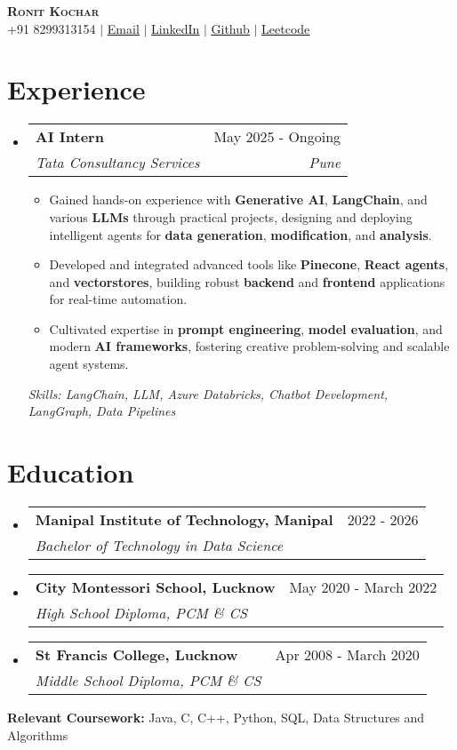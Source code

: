 \documentclass[letterpaper,10pt]{article}
\makeatletter
\newcommand{\resumeItem}[1]{
  \item\footnotesize{
    {#1 \vspace{-1pt}}
  }
}
\newcommand{\resumeSubheading}[4]{
  \vspace{-1pt}\item
    \begin{tabular*}{0.97\textwidth}[t]{l@{\extracolsep{\fill}}r}
      \textbf{#1} & #2 \\
      \textit{\footnotesize#3} & \textit{\footnotesize #4} \\
    \end{tabular*}\vspace{-5pt}
}
\newcommand{\resumeSubHeadingListStart}{\begin{itemize}[leftmargin=0.15in, label={}]}
\newcommand{\resumeSubHeadingListEnd}{\end{itemize}}
\newcommand{\resumeItemListStart}{\begin{itemize}}
\newcommand{\resumeItemListEnd}{\end{itemize}\vspace{-3pt}}
\makeatother
\begin{document}
\begin{center}
    \textbf{\Huge \scshape Ronit Kochar} \\ \vspace{1pt}
    \small +91 8299313154 $|$ \href{mailto:ronitkochar2001@gmail.com}{\underline{Email}} $|$
    \href{https://www.linkedin.com/in/ronit-kochar-0a70841b7/}{\underline{LinkedIn}} $|$
    \href{https://github.com/RonitKochar}{\underline{Github}} $|$
    \href{https://leetcode.com/u/RonitKochar/}{\underline{Leetcode}}
\end{center}

\section{Experience}
  \resumeSubHeadingListStart
      \resumeSubheading
      {AI Intern}{May 2025 - Ongoing}
      {Tata Consultancy Services}{Pune}
      \resumeItemListStart
        \resumeItem{Gained hands-on experience with \textbf{Generative AI}, \textbf{LangChain}, and various \textbf{LLMs} through practical projects, designing and deploying intelligent agents for \textbf{data generation}, \textbf{modification}, and \textbf{analysis}.}
        \resumeItem{Developed and integrated advanced tools like \textbf{Pinecone}, \textbf{React agents}, and \textbf{vectorstores}, building robust \textbf{backend} and \textbf{frontend} applications for real-time automation.}
        \resumeItem{Cultivated expertise in \textbf{prompt engineering}, \textbf{model evaluation}, and modern \textbf{AI frameworks}, fostering creative problem-solving and scalable agent systems.}
      \resumeItemListEnd

      {\small\textit{Skills: LangChain, LLM, Azure Databricks, Chatbot Development, LangGraph, Data Pipelines}}
  \resumeSubHeadingListEnd

\section{Education}
  \resumeSubHeadingListStart
    \resumeSubheading
      {Manipal Institute of Technology, Manipal}{2022 - 2026}
      {Bachelor of Technology in Data Science}{}
    \resumeSubheading
      {City Montessori School, Lucknow}{May 2020 - March 2022}
      {High School Diploma, PCM \& CS}{}
    \resumeSubheading
      {St Francis College, Lucknow}{Apr 2008 - March 2020}
      {Middle School Diploma, PCM \& CS}{}
  \resumeSubHeadingListEnd
  \vspace*{0.1cm}
  \textbf{Relevant Coursework:} Java, C, C++, Python, SQL, Data Structures and Algorithms
\end{document}
